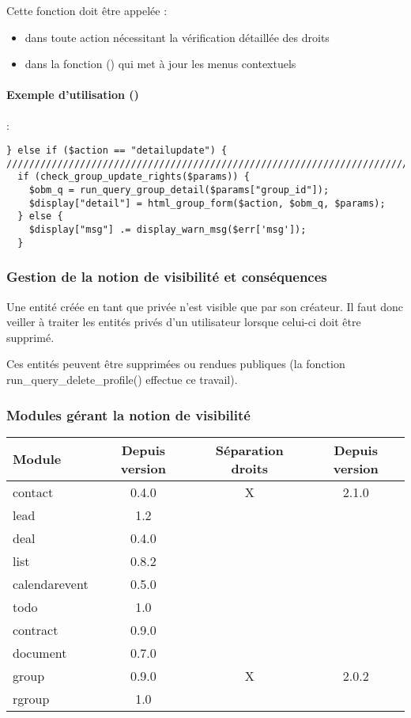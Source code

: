 Cette fonction doit être appelée :
\begin{itemize}
\item dans toute action nécessitant la vérification détaillée des droits
\item dans la fonction () qui met à jour les menus contextuels
\end{itemize}


\paragraph{Exemple d'utilisation ()} :
\begin{verbatim}
} else if ($action == "detailupdate") {
///////////////////////////////////////////////////////////////////////////////
  if (check_group_update_rights($params)) {
    $obm_q = run_query_group_detail($params["group_id"]);
    $display["detail"] = html_group_form($action, $obm_q, $params);
  } else {
    $display["msg"] .= display_warn_msg($err['msg']);
  }

\end{verbatim}


\subsubsection{Gestion de la notion de visibilité et conséquences}

Une entité créée en tant que privée n'est visible que par son créateur.
Il faut donc veiller à traiter les entités privés d'un utilisateur lorsque celui-ci doit être supprimé.

Ces entités peuvent être supprimées ou rendues publiques (la fonction run\_query\_delete\_profile() effectue ce travail).


\subsubsection{Modules gérant la notion de visibilité}

\begin{tabular}{|p{3cm}|c|c|c|}
\hline
\textbf{Module} & \textbf{Depuis version} & \textbf{Séparation droits} & \textbf{Depuis version} \\
\hline
contact & 0.4.0 & X & 2.1.0\\
\hline
lead & 1.2 & & \\
\hline
deal & 0.4.0 & &\\
\hline
list & 0.8.2 & &\\
\hline
calendarevent & 0.5.0 & &\\
\hline
todo & 1.0 & &\\
\hline
contract & 0.9.0 & &\\
\hline
document & 0.7.0 & &\\
\hline
group & 0.9.0 & X & 2.0.2 \\
\hline
rgroup & 1.0 & &\\
\hline
\end{tabular}
